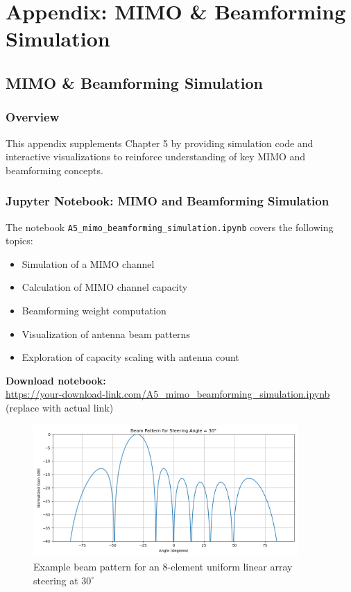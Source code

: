 

\chapter{Appendix: MIMO \& Beamforming Simulation}

\section{MIMO \& Beamforming Simulation}

\subsection{Overview}
This appendix supplements Chapter 5 by providing simulation code and interactive visualizations to reinforce understanding of key MIMO and beamforming concepts.

\subsection{Jupyter Notebook: MIMO and Beamforming Simulation}

The notebook \texttt{A5\_mimo\_beamforming\_simulation.ipynb} covers the following topics:

\begin{itemize}
    \item Simulation of a MIMO channel
    \item Calculation of MIMO channel capacity
    \item Beamforming weight computation
    \item Visualization of antenna beam patterns
    \item Exploration of capacity scaling with antenna count
\end{itemize}

\noindent\textbf{Download notebook:} \\
\url{https://your-download-link.com/A5_mimo_beamforming_simulation.ipynb} \hfill (replace with actual link)

\begin{figure}[h!]
    \centering
    \includegraphics[width=0.9\textwidth]{./figures/beam_pattern_example.png}
    \caption{Example beam pattern for an 8-element uniform linear array steering at $30^\circ$}
    \label{fig:beam-pattern}
\end{figure}

